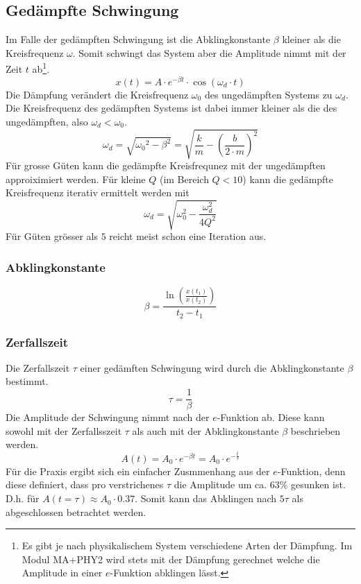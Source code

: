 \subsection{Gedämpfte Schwingung}
Im Falle der gedämpften Schwingung ist die Abklingkonstante $\beta$
kleiner als die Kreisfrequenz $\omega$. Somit schwingt das System
aber die Amplitude nimmt mit der Zeit $t$ ab\footnote{Es gibt je nach
physikalischem System verschiedene Arten der Dämpfung. Im Modul
MA+PHY2 wird stets mit der Dämpfung gerechnet welche die Amplitude
in einer $e$-Funktion abklingen lässt.}.
\[ \boxed{x(t) 
	= A \cdot e^{-\beta t} \cdot \cos(\omega_d \cdot t)
} \]
Die Dämpfung verändert die Kreisfrequenz $\omega_0$ des ungedämpften 
Systems zu $\omega_d$. Die Kreisfrequenz des gedämpften Systems ist
dabei immer kleiner als die des ungedämpften, also $\omega_d < \omega_0$.
\[ \boxed{\omega_d 
	= \sqrt{{\omega_0}^2 - \beta^2} 
	= \sqrt{\frac{k}{m} - \left({\frac{b}{2 \cdot m}}\right)^2}
} \]
Für grosse Güten kann die gedämpfte Kreisfrequnez mit der ungedämpften
approiximiert werden. Für kleine $Q$ (im Bereich $Q<10$) kann die
 gedämpfte Kreisfrequenz iterativ ermittelt werden mit
\[ \omega_d 
	=  \sqrt{\omega_0^2 - \frac{\omega_d^2}{4Q^2}}
\]
Für Güten grösser als $5$ reicht meist schon eine Iteration aus.

\subsubsection{Abklingkonstante}
\[ \boxed{\beta 
	= \frac{\ln\left(\frac{x(t_1)}{x(t_2)}\right)}{t_2 - t_1}
} \]

\subsubsection{Zerfallszeit}
Die Zerfallszeit $\tau$ einer gedämften Schwingung wird durch die 
Abklingkonstante $\beta$ bestimmt.
\[ \boxed{\tau 
	= \frac{1}{\beta}
} \]
Die Amplitude der Schwingung nimmt nach der $e$-Funktion ab. Diese kann
sowohl mit der Zerfallsszeit $\tau$ als auch mit der Abklingkonstante 
$\beta$ beschrieben werden.
\[ \boxed{A(t) 
	= A_0 \cdot e^{-\beta t} 
	= A_0 \cdot e^{-\frac{t}{\tau}}
} \]
Für die Praxis ergibt sich ein einfacher Zusmmenhang aus der $e$-Funktion,
denn diese definiert, dass pro verstrichenes $\tau$ die Amplitude um ca.
63\% gesunken ist. D.h. für $A(t=\tau) \approx A_0 \cdot 0.37$. Somit kann
das Abklingen nach $5\tau$ als abgeschlossen betrachtet werden.

